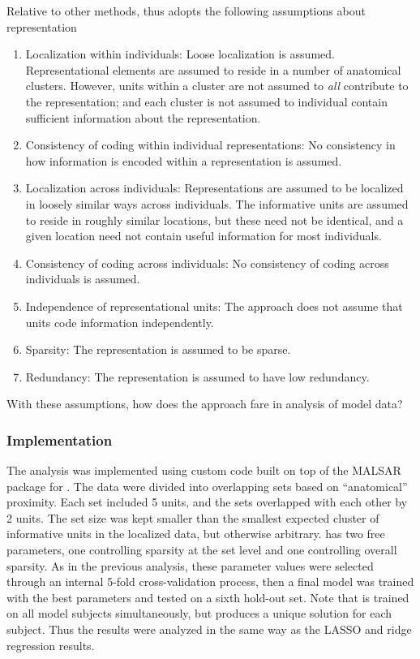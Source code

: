 Relative to other methods, \soslasso thus adopts the following assumptions about representation
\begin{enumerate}
\item Localization within individuals: Loose localization is assumed. Representational elements are assumed to reside in a number of anatomical clusters. However, units within a cluster are not assumed to {\em all} contribute to the representation; and each cluster is not assumed to individual contain sufficient information about the representation.

\item Consistency of coding within individual representations: No consistency in how information is encoded within a representation is assumed.

\item Localization across individuals: Representations are assumed to be localized in loosely similar ways across individuals. The informative units are assumed to reside in roughly similar locations, but these need not be identical, and a given location need not contain useful information for most individuals.

\item Consistency of coding across individuals: No consistency of coding across individuals is assumed.

\item Independence of representational units: The approach does not assume that units code information independently.

\item Sparsity: The representation is assumed to be sparse.

\item Redundancy: The representation is assumed to have low redundancy.
\end{enumerate}

With these assumptions, how does the approach fare in analysis of model data?

\subsubsection{Implementation} 
The \soslasso analysis was implemented using custom code built on top of the MALSAR package\cite{zhou2012mutal} for \matlab. The data were divided into overlapping sets based on ``anatomical'' proximity. Each set included 5 units, and the sets overlapped with each other by 2 units. The set size was kept smaller than the smallest expected cluster of informative units in the localized data, but otherwise arbitrary. \soslasso has two free parameters, one controlling sparsity at the set level and one controlling overall sparsity. As in the previous analysis, these parameter values  were selected through an internal 5-fold cross-validation process, then a final model was trained with the best parameters and tested on a sixth hold-out set. Note that \soslasso is trained on all model subjects simultaneously, but produces a unique solution for each subject. Thus the results were analyzed in the same way as the LASSO and ridge regression results.

